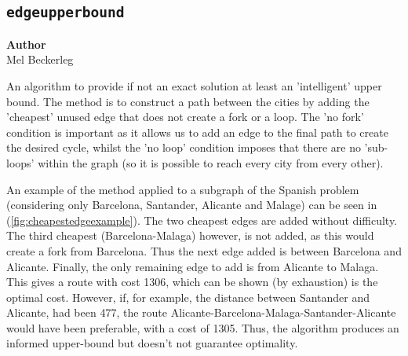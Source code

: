 \subsection{\texttt{edgeupperbound}}
\label{subsec:degeupperbound}

\begin{flushright}
\textbf{Author} \\
Mel Beckerleg
\end{flushright}

An algorithm to provide if not an exact solution at least an 'intelligent' upper bound. The method is to construct a path between the cities by adding the 'cheapest' unused edge that does not create a fork or a loop. The 'no fork' condition is important as it allows us to add an edge to the final path to create the desired cycle, whilst the 'no loop' condition imposes that there are no 'sub-loops' within the graph (so it is possible to reach every city from every other). 

An example of the method applied to a subgraph of the Spanish problem (considering only Barcelona, Santander, Alicante and Malage) can be seen in (\ref{fig:cheapestedgeexample}). The two cheapest edges are added without difficulty. The third cheapest (Barcelona-Malaga) however, is not added, as this would create a fork from Barcelona. Thus the next edge added is between Barcelona and Alicante. Finally, the only remaining edge to add is from Alicante to Malaga. This gives a route with cost 1306, which can be shown (by exhaustion) is the optimal cost. However, if, for example, the distance between Santander and Alicante, had been 477, the route Alicante-Barcelona-Malaga-Santander-Alicante would have been preferable, with a cost of 1305. Thus, the algorithm produces an informed upper-bound but doesn't not guarantee optimality. 

